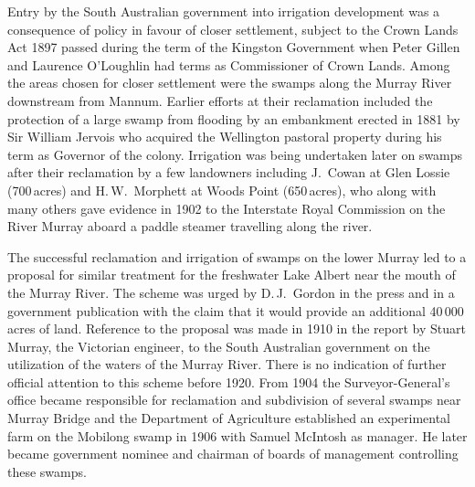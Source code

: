 Entry by the South Australian government into irrigation development
was a consequence of policy in favour of closer settlement, subject to
the Crown Lands Act 1897 passed during the term of the Kingston
Government when Peter Gillen and Laurence O'Loughlin had terms as
Commissioner of Crown Lands.  Among the areas chosen for closer
settlement were the swamps along the Murray River downstream from
Mannum.  Earlier efforts at their reclamation included the protection
of a large swamp from flooding by an embankment erected in 1881 by Sir
William Jervois  who acquired the Wellington
pastoral property during his term as Governor of the colony.
Irrigation was being undertaken later on swamps after their
reclamation by a few landowners including J.~Cowan 
at Glen Lossie (700\,acres) and H.\,W.~Morphett 
at Woods Point (650\,acres), who along with many others gave evidence
in 1902 to the Interstate Royal Commission on the River Murray aboard
a paddle steamer travelling along the river.

The successful reclamation and irrigation of swamps on the lower
Murray led to a proposal for similar treatment for the freshwater Lake
Albert near the mouth of the Murray River.  The scheme was urged by
D.\,J.~Gordon  in the press and in a government
publication with the claim that it would provide an additional
40\,000\,acres of land.  Reference to the proposal was made in 1910 in
the report by Stuart Murray,  the Victorian
engineer, to the South Australian government on the utilization of the
waters of the Murray River. There is no indication of further official
attention to this scheme before 1920.  From 1904 the
Surveyor-General's office became responsible for reclamation and
subdivision of several swamps near Murray Bridge and the Department of
Agriculture established an experimental farm on the Mobilong swamp
 in
1906 with Samuel McIntosh  as manager.  He later
became government nominee and chairman of boards of management
controlling these swamps.

